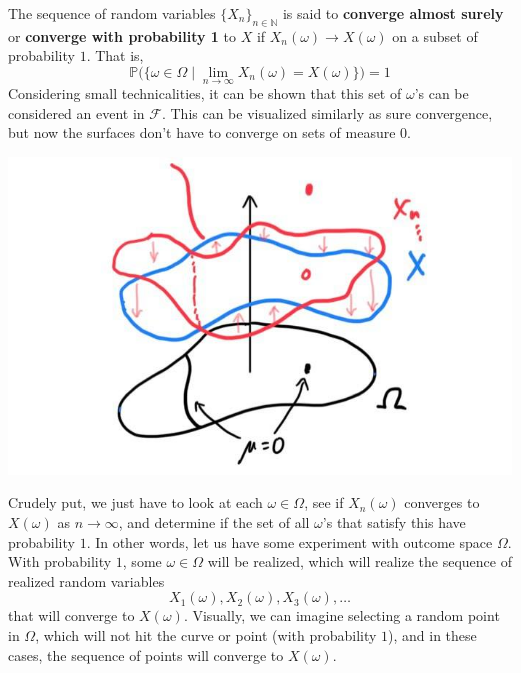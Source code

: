 \documentclass{article}
\begin{document}
    \begin{definition}
      The sequence of random variables $\{ X_n\}_{n \in \mathbb{N}}$ is said to \textbf{converge almost surely} or \textbf{converge with probability 1} to $X$ if $X_n (\omega) \rightarrow X (\omega)$ on a subset of probability $1$. That is, 
      \begin{equation}
        \mathbb{P} \big( \{ \omega \in \Omega \mid \lim_{n \rightarrow \infty} X_n (\omega) = X(\omega) \} \big) = 1
      \end{equation}
      Considering small technicalities, it can be shown that this set of $\omega$'s can be considered an event in $\mathcal{F}$. This can be visualized similarly as sure convergence, but now the surfaces don't have to converge on sets of measure $0$. 
      \begin{center}
        \includegraphics[scale=0.3]{img/almost_sure_convergence.jpg}
      \end{center}
      Crudely put, we just have to look at each $\omega \in \Omega$, see if $X_n (\omega)$ converges to $X(\omega)$ as $n \rightarrow \infty$, and determine if the set of all $\omega$'s that satisfy this have probability $1$. In other words, let us have some experiment with outcome space $\Omega$. With probability $1$, some $\omega \in \Omega$ will be realized, which will realize the sequence of realized random variables
      \begin{equation}
        X_1 (\omega), X_2 (\omega), X_3 (\omega), \ldots
      \end{equation}
      that will converge to $X(\omega)$. Visually, we can imagine selecting a random point in $\Omega$, which will not hit the curve or point (with probability $1$), and in these cases, the sequence of points will converge to $X(\omega)$. 

\end{definition}
\end{document}

